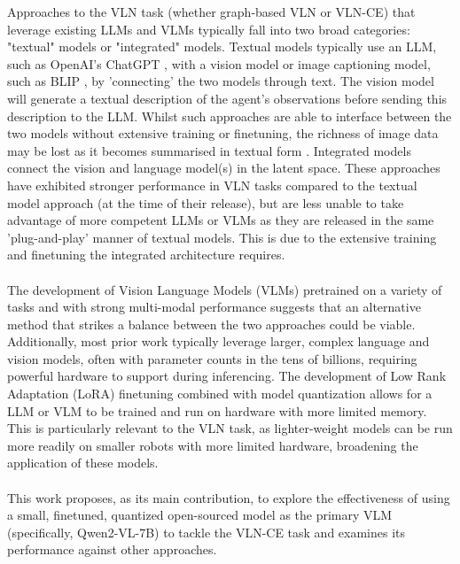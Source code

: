 \documentclass{svproc}
\begin{document}
    Approaches to the VLN task (whether graph-based VLN or VLN-CE) that leverage existing LLMs and VLMs typically fall into two broad categories: "textual" models or "integrated" models. Textual models \cite{long2023_discussnav, pan2024langnavlanguageperceptualrepresentation, zhou2023navgptexplicitreasoningvisionandlanguage, lin2024navcotboostingllmbasedvisionandlanguage, open-nav} typically use an LLM, such as OpenAI's ChatGPT \cite{openai2024gpt4technicalreport}, with a vision model or image captioning model, such as BLIP \cite{li2022blipbootstrappinglanguageimagepretraining}, by 'connecting' the two models through text. The vision model will generate a textual description of the agent's observations before sending this description to the LLM. Whilst such approaches are able to interface between the two models without extensive training or finetuning, the richness of image data may be lost as it becomes summarised in textual form \cite{pan2024langnavlanguageperceptualrepresentation}. Integrated models \cite{hong2021_vlnbert, navgpt2, chen2021_HAMT, HE2024110511_MemoryAdaptiveVLN} connect the vision and language model(s) in the latent space. These approaches have exhibited stronger performance in VLN tasks compared to the textual model approach (at the time of their release), but are less unable to take advantage of more competent LLMs or VLMs as they are released in the same 'plug-and-play' manner of textual models. This is due to the extensive training and finetuning the integrated architecture requires.
    \\ \\
    The development of Vision Language Models (VLMs) pretrained on a variety of tasks and with strong multi-modal performance \cite{Qwen-VL, Qwen2VL, qwen2, geminiteam2024geminifamilyhighlycapable, openai2024gpt4technicalreport} suggests that an alternative method that strikes a balance between the two approaches could be viable. Additionally, most prior work typically leverage larger, complex language and vision models, often with parameter counts in the tens of billions, requiring powerful hardware to support during inferencing. The development of Low Rank Adaptation (LoRA) finetuning \cite{LoRA} combined with model quantization \cite{MLSYS2024_42a452cb} allows for a LLM or VLM to be trained and run on hardware with more limited memory. This is particularly relevant to the VLN task, as lighter-weight models can be run more readily on smaller robots with more limited hardware, broadening the application of these models.
    \\ \\
    This work proposes, as its main contribution, to explore the effectiveness of using a small, finetuned, quantized open-sourced model as the primary VLM (specifically, Qwen2-VL-7B) to tackle the VLN-CE task and examines its performance against other approaches. 
\end{document}
